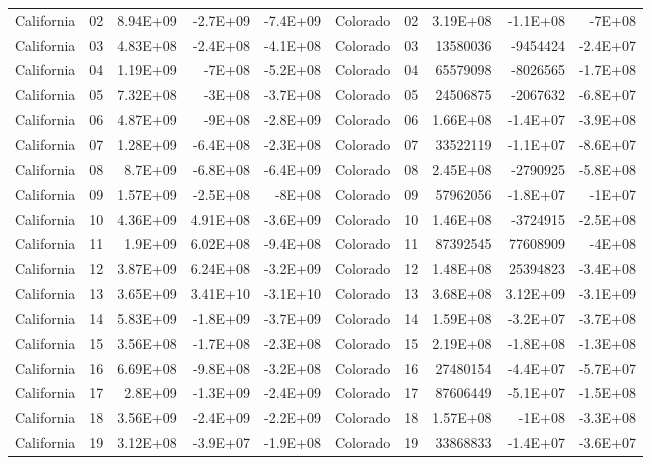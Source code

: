 \begin{landscape}
\begin{singlespace}
\begin{longtable}{lrrrr|lrrrr}
		California &  02  & 8.94E+09 & -2.7E+09 & -7.4E+09 & Colorado &  02  & 3.19E+08 & -1.1E+08 & -7E+08 \\
		California &  03  & 4.83E+08 & -2.4E+08 & -4.1E+08 & Colorado &  03  & 13580036 & -9454424 & -2.4E+07 \\
		California &  04  & 1.19E+09 & -7E+08 & -5.2E+08 & Colorado &  04  & 65579098 & -8026565 & -1.7E+08 \\
		California &  05  & 7.32E+08 & -3E+08 & -3.7E+08 & Colorado &  05  & 24506875 & -2067632 & -6.8E+07 \\
		California &  06  & 4.87E+09 & -9E+08 & -2.8E+09 & Colorado &  06  & 1.66E+08 & -1.4E+07 & -3.9E+08 \\
		California &  07  & 1.28E+09 & -6.4E+08 & -2.3E+08 & Colorado &  07  & 33522119 & -1.1E+07 & -8.6E+07 \\
		California &  08  & 8.7E+09 & -6.8E+08 & -6.4E+09 & Colorado &  08  & 2.45E+08 & -2790925 & -5.8E+08 \\
		California &  09  & 1.57E+09 & -2.5E+08 & -8E+08 & Colorado &  09  & 57962056 & -1.8E+07 & -1E+07 \\
		California &  10 & 4.36E+09 & 4.91E+08 & -3.6E+09 & Colorado &  10 & 1.46E+08 & -3724915 & -2.5E+08 \\
		California &  11 & 1.9E+09 & 6.02E+08 & -9.4E+08 & Colorado &  11 & 87392545 & 77608909 & -4E+08 \\
		California &  12 & 3.87E+09 & 6.24E+08 & -3.2E+09 & Colorado &  12 & 1.48E+08 & 25394823 & -3.4E+08 \\
		California &  13 & 3.65E+09 & 3.41E+10 & -3.1E+10 & Colorado &  13 & 3.68E+08 & 3.12E+09 & -3.1E+09 \\
		California &  14 & 5.83E+09 & -1.8E+09 & -3.7E+09 & Colorado &  14 & 1.59E+08 & -3.2E+07 & -3.7E+08 \\
		California &  15 & 3.56E+08 & -1.7E+08 & -2.3E+08 & Colorado &  15 & 2.19E+08 & -1.8E+08 & -1.3E+08 \\
		California &  16 & 6.69E+08 & -9.8E+08 & -3.2E+08 & Colorado &  16 & 27480154 & -4.4E+07 & -5.7E+07 \\
		California &  17 & 2.8E+09 & -1.3E+09 & -2.4E+09 & Colorado &  17 & 87606449 & -5.1E+07 & -1.5E+08 \\
		California &  18 & 3.56E+09 & -2.4E+09 & -2.2E+09 & Colorado &  18 & 1.57E+08 & -1E+08 & -3.3E+08 \\
		California &  19 & 3.12E+08 & -3.9E+07 & -1.9E+08 & Colorado &  19 & 33868833 & -1.4E+07 & -3.6E+07 \\

\end{longtable}
\end{singlespace}
\end{landscape}
